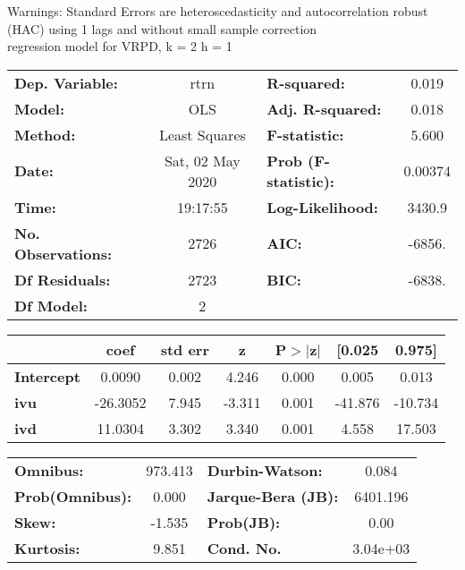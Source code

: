Warnings: \newline
 [1] Standard Errors are heteroscedasticity and autocorrelation robust (HAC) using 1 lags and without small sample correction\\ 

regression model for VRPD, k = 2 h = 1\begin{center}
\begin{tabular}{lclc}
\toprule
\textbf{Dep. Variable:}    &       rtrn       & \textbf{  R-squared:         } &     0.019   \\
\textbf{Model:}            &       OLS        & \textbf{  Adj. R-squared:    } &     0.018   \\
\textbf{Method:}           &  Least Squares   & \textbf{  F-statistic:       } &     5.600   \\
\textbf{Date:}             & Sat, 02 May 2020 & \textbf{  Prob (F-statistic):} &  0.00374    \\
\textbf{Time:}             &     19:17:55     & \textbf{  Log-Likelihood:    } &    3430.9   \\
\textbf{No. Observations:} &        2726      & \textbf{  AIC:               } &    -6856.   \\
\textbf{Df Residuals:}     &        2723      & \textbf{  BIC:               } &    -6838.   \\
\textbf{Df Model:}         &           2      & \textbf{                     } &             \\
\bottomrule
\end{tabular}
\begin{tabular}{lcccccc}
                   & \textbf{coef} & \textbf{std err} & \textbf{z} & \textbf{P$> |$z$|$} & \textbf{[0.025} & \textbf{0.975]}  \\
\midrule
\textbf{Intercept} &       0.0090  &        0.002     &     4.246  &         0.000        &        0.005    &        0.013     \\
\textbf{ivu}       &     -26.3052  &        7.945     &    -3.311  &         0.001        &      -41.876    &      -10.734     \\
\textbf{ivd}       &      11.0304  &        3.302     &     3.340  &         0.001        &        4.558    &       17.503     \\
\bottomrule
\end{tabular}
\begin{tabular}{lclc}
\textbf{Omnibus:}       & 973.413 & \textbf{  Durbin-Watson:     } &    0.084  \\
\textbf{Prob(Omnibus):} &   0.000 & \textbf{  Jarque-Bera (JB):  } & 6401.196  \\
\textbf{Skew:}          &  -1.535 & \textbf{  Prob(JB):          } &     0.00  \\
\textbf{Kurtosis:}      &   9.851 & \textbf{  Cond. No.          } & 3.04e+03  \\
\bottomrule
\end{tabular}
\end{center}

